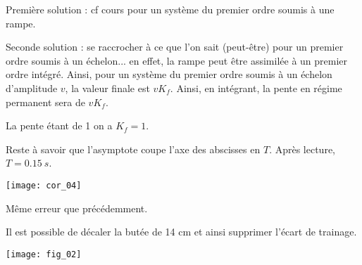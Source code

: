 \begin{multicols}{2}
\begin{corrige}
Première solution : cf cours pour un système du premier ordre soumis à une rampe. 

Seconde solution : se raccrocher à ce que l'on sait (peut-être) pour un premier ordre soumis à un échelon... en effet, la rampe peut être assimilée à un premier ordre intégré. Ainsi, pour un système du premier ordre soumis à un échelon d'amplitude $v$, la valeur finale est $vK_f$. Ainsi, en intégrant, la pente en régime permanent sera de $vK_f$. 

La pente étant de 1 on a $K_f=1$. 

Reste à savoir que l'asymptote coupe l'axe des abscisses en $T$. Après lecture, $T=\SI{0,15}{s}$.
\end{corrige} 
\begin{center}
\texttt{[image: cor\_04]}
\end{center}
\else \fi





\ifprof \begin{corrige}
Même erreur que précédemment.
\end{corrige} \else \fi


\ifprof \begin{corrige}
Il est possible de décaler la butée de 14 cm et ainsi supprimer l'écart de trainage.
\end{corrige} \else \fi

\ifprof
\else
\end{multicols}
\fi
\ifprof
\else
\begin{center}
\texttt{[image: fig\_02]}
\end{center}
\fi
